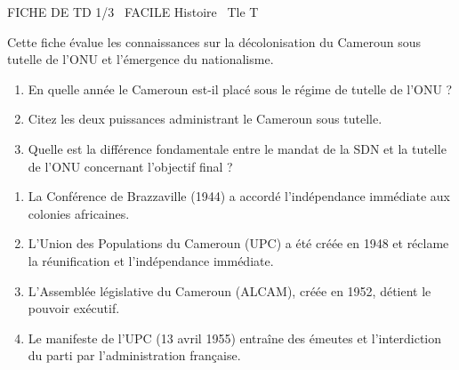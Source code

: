 \documentclass[11pt]{article}
\begin{document}
\begin{tcolorbox}[enhanced,colback=popink,colframe=popink,arc=10pt,boxrule=0pt,left=12pt,right=12pt,top=9pt,bottom=9pt]
{\color{white}\popxbold\small FICHE DE TD 1/3 \textbullet\ FACILE \hfill Histoire \textbullet\ Tle T\par}
\end{tcolorbox}
\vspace{4pt}
Cette fiche évalue les connaissances sur la décolonisation du Cameroun sous tutelle de l'ONU et l'émergence du nationalisme.

\begin{exercice}
\begin{enumerate}
    \item En quelle année le Cameroun est-il placé sous le régime de tutelle de l'ONU ?
    \item Citez les deux puissances administrant le Cameroun sous tutelle.
    \item Quelle est la différence fondamentale entre le mandat de la SDN et la tutelle de l'ONU concernant l'objectif final ?
\end{enumerate}
\end{exercice}

\begin{exercice}
\begin{enumerate}
    \item La Conférence de Brazzaville (1944) a accordé l'indépendance immédiate aux colonies africaines.
    \item L'Union des Populations du Cameroun (UPC) a été créée en 1948 et réclame la réunification et l'indépendance immédiate.
    \item L'Assemblée législative du Cameroun (ALCAM), créée en 1952, détient le pouvoir exécutif.
    \item Le manifeste de l'UPC (13 avril 1955) entraîne des émeutes et l'interdiction du parti par l'administration française.
\end{enumerate}
\end{exercice}
\end{document}
